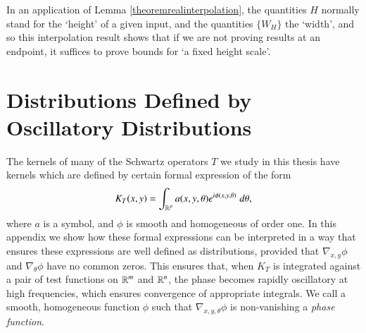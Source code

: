 In an application of Lemma \ref{theoremrealinterpolation}, the quantities $H$ normally stand for the `height' of a given input, and the quantities $\{ W_H \}$ the `width', and so this interpolation result shows that if we are not proving results at an endpoint, it suffices to prove bounds for `a fixed height scale'.









\renewcommand{\thechapter}{B}
\chapter{Distributions Defined by Oscillatory Distributions} \label{cha:distributions_defined_by_oscillatory_distributions}

The kernels of many of the Schwartz operators $T$ we study in this thesis have kernels which are defined by certain formal expression of the form
%
\begin{equation}
    K_T(x,y) = \int_{\operatorname{\mathbb{R}}^p} a(x,y,\theta) e^{i \phi(x,y,\theta)}\; d\theta,
\end{equation}
%
where $a$ is a symbol, and $\phi$ is smooth and homogeneous of order one.  In this appendix we show how these formal expressions can be interpreted in a way that ensures these expressions are well defined as distributions, provided that $\nabla_{x,y} \phi$ and $\nabla_\theta \phi$ have no common zeros. This ensures that, when $K_T$ is integrated against a pair of test functions on $\operatorname{\mathbb{R}}^m$ and $\operatorname{\mathbb{R}}^n$, the phase becomes rapidly oscillatory at high frequencies, which ensures convergence of appropriate integrals. We call a smooth, homogeneous function $\phi$ such that $\nabla_{x,y,\theta} \phi$ is non-vanishing a \emph{phase function}.

